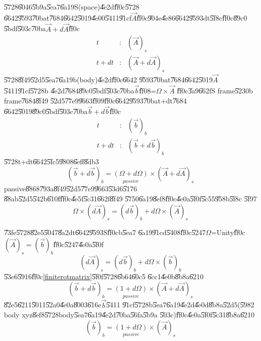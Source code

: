 \documentclass[12pt]{article}
\begin{document}
\U{5728}\U{6046}\U{5b9a}\U{5ea7}\U{6a19}S(space)\U{4e2d}\U{ff0c}\U{5728}%
\U{6642}\U{9593}\U{70ba}t\U{7684}\U{6642}\U{5019}\U{4e00}\U{5411}\U{91cf}$%
\vec{A}$\U{ff0c}\U{904e}\U{4e86}\U{6642}\U{9593}dt\U{5f8c}\U{ff0c}\U{89c0}%
\U{5bdf}\U{503c}\U{70ba}$\vec{A}+d\vec{A}$\U{ff0c}%
\begin{eqnarray}
t &:&(\vec{A})_{s} \\
t+dt &:&\left( \vec{A}+d\vec{A}\right) _{s}
\end{eqnarray}%
\U{5728}\U{8f49}\U{52d5}\U{5ea7}\U{6a19}b(body)\U{4e2d}\U{ff0c}\U{6642}%
\U{9593}\U{70ba}t\U{7684}\U{6642}\U{5019}$\vec{A}$\U{5411}\U{91cf}\U{5728}b%
\U{4e2d}\U{7684}\U{89c0}\U{5bdf}\U{503c}\U{70ba}$\vec{b}$\U{ff08}=$\Omega
\times \vec{A}$ \U{ff0c}\U{3a9}\U{662f}S frame\U{5230}b frame\U{7684}\U{8f49}%
\U{52d5}\U{77e9}\U{9663}\U{ff09}\U{ff0c}\U{6642}\U{9593}\U{70ba}t+dt\U{7684}%
\U{6642}\U{5019}\U{89c0}\U{5bdf}\U{503c}\U{70ba}$\vec{b}+d\vec{b}$\U{ff0c}%
\begin{eqnarray}
t &:&\left( \vec{b}\right) _{b} \\
t+dt &:&\left( \vec{b}+d\vec{b}\right) _{b}
\end{eqnarray}%
\U{5728}t+dt\U{6642}\U{5fc5}\U{9808}\U{6eff}\U{8db3}%
\begin{equation}
\left( \vec{b}+d\vec{b}\right) _{b}=\underset{passive}{\left( \Omega
+d\Omega \right) }\times \left( \vec{A}+d\vec{A}\right) _{s}
\label{finiterotmatrix}
\end{equation}%
passive\U{8868}\U{793a}\U{8f49}\U{52d5}\U{77e9}\U{9663}\U{53d6}\U{5176}%
\U{88ab}\U{52d5}\U{542b}\U{610f}\U{ff0c}\U{4e5f}\U{5c31}\U{662f}\U{8f49}%
\U{5750}\U{6a19}\U{8ef8}\U{ff0c}\U{4e0a}\U{5f0f}\U{5c55}\U{958b}\U{5f8c}%
\U{5f97}%
\begin{equation}
\Omega \times \left( d\vec{A}\right) _{s}=\left( d\vec{b}\right)
_{b}+d\Omega \times \left( \vec{A}\right) _{s}
\end{equation}

\U{73fe}\U{5728}\U{82e5}\U{5047}\U{8a2d}t\U{6642}\U{9593}S\U{ff0c}b\U{5ea7}%
\U{6a19}\U{91cd}\U{5408}\U{ff0c}\U{5247}$\Omega $=Unity\U{ff0c}$\left( \vec{A%
}\right) _{s}=\left( \vec{b}\right) _{b}$\U{ff0c}\U{5247}\U{4e0a}\U{5f0f}%
\begin{equation}
\left( d\vec{A}\right) _{s}=\left( d\vec{b}\right) _{b}+d\Omega \times
\left( \vec{b}\right) _{b}  \label{vectorrateofchange}
\end{equation}%
\U{53e6}\U{5916}\U{ff0c}\ref{finiterotmatrix}\U{5f0f}\U{5728}\U{6b64}\U{60c5}%
\U{6cc1}\U{4e0b}\U{8b8a}\U{6210}%
\begin{equation}
\left( \vec{b}+d\vec{b}\right) _{b}=\underset{passive}{\left( 1+d\Omega
\right) }\times \left( \vec{A}+d\vec{A}\right) _{s}
\end{equation}%
\U{82e5}\U{6211}\U{5011}\U{52a0}\U{4e0a}\U{8003}\U{616e}$\vec{b}$\U{5411}%
\U{91cf}\U{5728}b\U{5ea7}\U{6a19}\U{4e2d}\U{4e0d}\U{8b8a}\U{52d5}(\U{5982}%
body xyz\U{8ef8}\U{5728}body\U{5ea7}\U{6a19}\U{4e2d}\U{70ba}\U{56fa}\U{5b9a}%
\U{503c})\U{ff0c}\U{4e0a}\U{5f0f}\U{5c31}\U{8b8a}\U{6210}%
\begin{equation}
\left( \vec{b}\right) _{b}=\underset{passive}{\left( 1+d\Omega \right) }%
\times \left( \vec{A}\right) _{s}  \label{baxesrot}
\end{equation}
\end{document}
